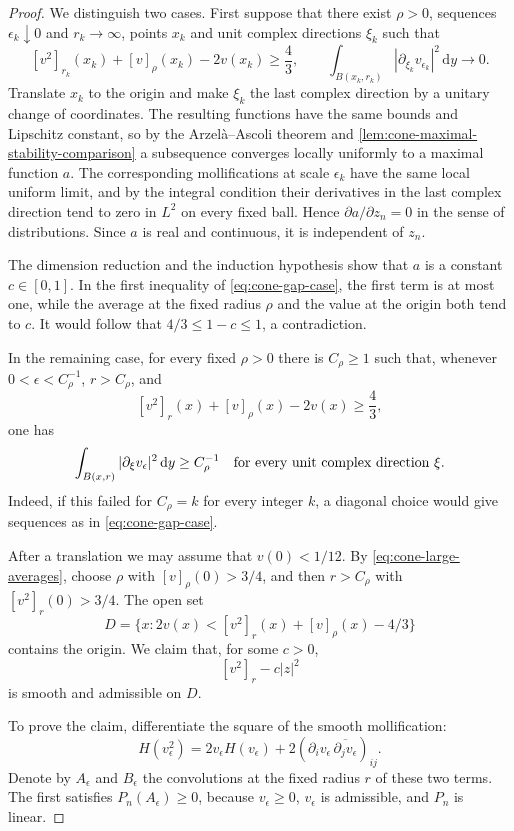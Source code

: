 \begin{proof}
We distinguish two cases. First suppose that there exist $\rho>0$, sequences $\epsilon_k\downarrow0$ and $r_k\to\infty$, points $x_k$ and unit complex directions $\xi_k$ such that
\begin{equation}\label{eq:cone-gap-case}
 [v^2]_{r_k}(x_k)+[v]_\rho(x_k)-2v(x_k)\geq\frac43,
 \qquad
 \int_{B(x_k,r_k)}|\partial_{\xi_k}v_{\epsilon_k}|^2\,\mathrm{d}y
       \longrightarrow0.
\end{equation}
Translate $x_k$ to the origin and make $\xi_k$ the last complex direction by a unitary change of coordinates. The resulting functions have the same bounds and Lipschitz constant, so by the Arzel\`a--Ascoli theorem and \cref{lem:cone-maximal-stability-comparison} a subsequence converges locally uniformly to a maximal function $a$. The corresponding mollifications at scale $\epsilon_k$ have the same local uniform limit, and by the integral condition their derivatives in the last complex direction tend to zero in $L^2$ on every fixed ball. Hence $\partial a/\partial z_n=0$ in the sense of distributions. Since $a$ is real and continuous, it is independent of $z_n$.

The dimension reduction and the induction hypothesis show that $a$ is a constant $c\in[0,1]$. In the first inequality of \eqref{eq:cone-gap-case}, the first term is at most one, while the average at the fixed radius $\rho$ and the value at the origin both tend to $c$. It would follow that $4/3\leq1-c\leq1$, a contradiction.

In the remaining case, for every fixed $\rho>0$ there is $C_\rho\geq1$ such that, whenever $0<\epsilon<C_\rho^{-1}$, $r>C_\rho$, and
\[
 [v^2]_r(x)+[v]_\rho(x)-2v(x)\geq\frac43,
\]
one has
\begin{equation}\label{eq:cone-directional-energy}
 \int_{B(x,r)}|\partial_\xi v_\epsilon|^2\,\mathrm{d}y
       \geq C_\rho^{-1}
       \quad\hbox{for every unit complex direction }\xi.
\end{equation}
Indeed, if this failed for $C_\rho=k$ for every integer $k$, a diagonal choice would give sequences as in \eqref{eq:cone-gap-case}.

After a translation we may assume that $v(0)<1/12$. By \eqref{eq:cone-large-averages}, choose $\rho$ with $[v]_\rho(0)>3/4$, and then $r>C_\rho$ with $[v^2]_r(0)>3/4$. The open set
\[
 D=\{x:2v(x)<[v^2]_r(x)+[v]_\rho(x)-4/3\}
\]
contains the origin. We claim that, for some $c>0$,
\[
 [v^2]_r-c|z|^2
\]
is smooth and admissible on $D$.

To prove the claim, differentiate the square of the smooth mollification:
\[
 H(v_\epsilon^2)
       =2v_\epsilon H(v_\epsilon)
            +2(\partial_i v_\epsilon\,\overline{\partial_jv_\epsilon})_{ij}.
\]
Denote by $A_\epsilon$ and $B_\epsilon$ the convolutions at the fixed radius $r$ of these two terms. The first satisfies $P_n(A_\epsilon)\geq0$, because $v_\epsilon\geq0$, $v_\epsilon$ is admissible, and $P_n$ is linear.


\end{proof}
